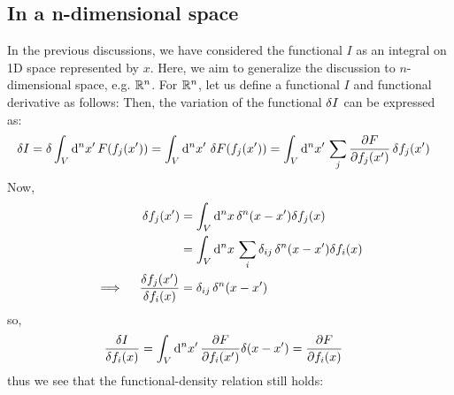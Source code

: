 \subsection{In a n-dimensional space}
In the previous discussions, we have considered the functional $I$ as an integral on 1D space represented by $x$.
Here, we aim to generalize the discussion to $n$-dimensional space, e.g. $\mathbb{R}^n$.
For $\mathbb{R}^n$, let us define a functional $I$ and functional derivative as follows:
Then, the variation of the functional $\fdif{I}$ can be expressed as:
\begin{align}
  \fdif{I} = \delta \int_V \odif[n]{x'} \, F(f_j(x'))
   & = \int_V \odif[n]{x'} \, \fdif{F}(f_j(x'))
  = \int_V \odif[n]{x'} \, \sum_j \pdv{F}{f_j(x')} \fdif{f_j}(x')
\end{align}
Now,
\begin{align}
  \delta f_j(x')                                       & = \int_V \odif[n]{x} \, \delta^n(x - x')\delta f_j(x)                         \\
                                                       & = \int_V \odif[n]{x} \,  \sum_i \delta_{ij} \, \delta^n(x - x') \delta f_i(x) \\
  \implies \quad  \frac{\delta f_j(x')}{\delta f_i(x)} & = \delta_{ij} \, \delta^n(x - x')
\end{align}
so,
\begin{align}
  \fdv{I}{f_i(x)} & = \int_V \odif[n]{x'} \, \pdv{F}{f_i (x')} \delta(x - x') = \pdv{F}{f_i(x)}
\end{align}
thus we see that the functional-density relation still holds:

\cite{eman-functionalDerivative}